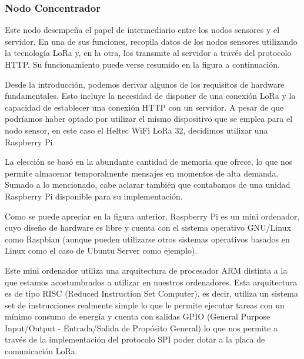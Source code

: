 \clearpage

\subsubsection{Nodo Concentrador}
Este nodo desempeña el papel de intermediario entre los nodos sensores y el servidor. En una de sus funciones, recopila datos de los nodos sensores utilizando la tecnología LoRa y, en la otra, los transmite al servidor a través del protocolo HTTP. Su funcionamiento puede verse resumido en la figura a continuación.



Desde la introducción, podemos derivar algunos de los requisitos de hardware fundamentales. Esto incluye la necesidad de disponer de una conexión LoRa y la capacidad de establecer una conexión HTTP con un servidor. A pesar de que podríamos haber optado por utilizar el mismo dispositivo que se emplea para el nodo sensor, en este caso el Heltec WiFi LoRa 32, decidimos utilizar una Raspberry Pi.

La elección se basó en la abundante cantidad de memoria que ofrece, lo que nos permite almacenar temporalmente mensajes en momentos de alta demanda. Sumado a lo mencionado, cabe aclarar también que contabamos de una unidad Raspberry Pi disponible para su implementación.


Como se puede apreciar en la figura anterior, Raspberry Pi es un mini ordenador, cuyo diseño de hardware es libre y cuenta con el sistema operativo GNU/Linux como Raspbian (aunque pueden utilizarse otros sistemas operativos basados en Linux como el caso de Ubuntu Server como ejemplo). 


Este mini ordenador utiliza una arquitectura de procesador ARM distinta a la que estamos acostumbrados a utilizar en nuestros ordenadores. Esta arquitectura es de tipo RISC (Reduced Instruction Set Computer), es decir, utiliza un sistema set de instrucciones realmente simple lo que le permite ejecutar tareas con un mínimo consumo de energía y cuenta con salidas GPIO (General Purpose Input/Output - Entrada/Salida de Propósito General) lo que nos permite a través de la implementación del protocolo SPI poder dotar a la placa de comunicación LoRa.

